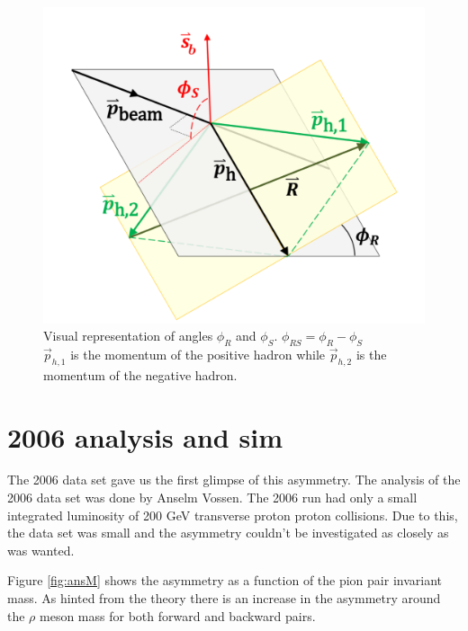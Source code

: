 \documentclass[abstract = on,listof=totoc, bibliography=totoc]{scrreprt}
\newcommand{\phir}{\phi_{R}}
\newcommand{\phis}{\phi_{S}}
\begin{document}
\begin{figure}
\begin{center}
\includegraphics[width = 1\textwidth]{IFF_frame_edit2}
\caption[Angles $\phis$ and $\phir$]{Visual representation of angles $\phi_R$ and $\phi_S$. $\phi_{RS} = \phi_R - \phi_S$ \\ $\vec{p}_{h,1}$ is the momentum of the positive hadron while  $\vec{p}_{h,2}$ is the momentum of the negative hadron.}
\label{fig:angleDeff}
\end{center}
\end{figure}




\chapter{2006 analysis and sim}
\label{chap:2006}

The 2006 data set gave us the first glimpse of this asymmetry. The analysis of the 2006 data set was done by Anselm Vossen. The 2006 run had only a small integrated luminosity of 200 GeV transverse proton proton collisions. Due to this, the data set was small and the asymmetry couldn't be investigated as closely as was wanted. 


Figure \ref{fig:ansM} shows the asymmetry as a function of the pion pair invariant mass. As hinted from the theory there is an increase in the asymmetry around the $\rho$ meson mass for both forward and backward pairs. 
\end{document}
